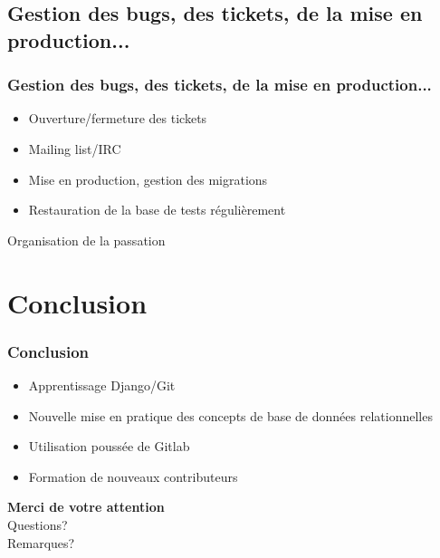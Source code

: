 \documentclass[10pt]{beamer}
\begin{document}
\subsection{Gestion des bugs, des tickets, de la mise en production...}
\begin{frame}[fragile]\frametitle{Gestion des bugs, des tickets, de la mise en production...}
    \begin{itemize}
        \item Ouverture/fermeture des tickets
        \item Mailing list/IRC
        \item Mise en production, gestion des migrations
        \item Restauration de la base de tests régulièrement
    \end{itemize}
    \par Organisation de la passation
\end{frame}

\section{Conclusion}
\begin{frame}[fragile]\frametitle{Conclusion}
    \begin{itemize}
        \item Apprentissage Django/Git
        \item Nouvelle mise en pratique des concepts de base de données relationnelles
        \item Utilisation poussée de Gitlab
        \item Formation de nouveaux contributeurs
    \end{itemize}
\end{frame}


\begin{frame}[fragile]
    \begin{center}
        \textbf{Merci de votre attention}\\
        Questions?\\
        Remarques?\\
    \end{center}
\end{frame}
\end{document}
